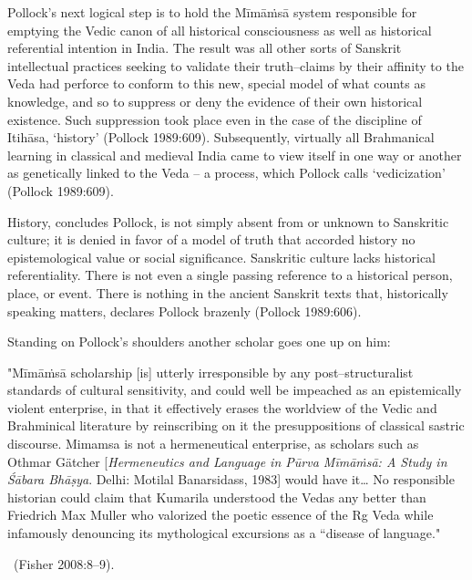 Pollock’s next logical step is to hold the Mīmāṁsā system responsible for emptying the Vedic canon of all historical consciousness as well as historical referential intention in India. The result was all other sorts of Sanskrit intellectual practices seeking to validate their truth–claims by their affinity to the Veda had perforce to conform to this new, special model of what counts as knowledge, and so to suppress or deny the evidence of their own historical existence. Such suppression took place even in the case of the discipline of Itihāsa, ‘history’ (Pollock 1989:609). Subsequently, virtually all Brahmanical learning in classical and medieval India came to view itself in one way or another as genetically linked to the Veda – a process, which Pollock calls ‘vedicization’ (Pollock 1989:609).

History, concludes Pollock, is not simply absent from or unknown to Sanskritic culture; it is denied in favor of a model of truth that accorded history no epistemological value or social significance. Sanskritic culture lacks historical referentiality. There is not even a single passing reference to a historical person, place, or event. There is nothing in the ancient Sanskrit texts that, historically speaking matters, declares Pollock brazenly (Pollock 1989:606).

Standing on Pollock’s shoulders another scholar goes one up on him:

\begin{myquote}
"Mīmāṁsā scholarship [is] utterly irresponsible by any post–structuralist standards of cultural sensitivity, and could well be impeached as an epistemically violent enterprise, in that it effectively erases the worldview of the Vedic and Brahminical literature by reinscribing on it the presuppositions of classical sastric discourse. Mimamsa is not a hermeneutical enterprise, as scholars such as Othmar Gätcher [\textit{Hermeneutics and Language in Pūrva Mīmāṁsā: A Study in Śābara Bhāṣya}. Delhi: Motilal Banarsidass, 1983] would have it… No responsible historian could claim that Kumarila understood the Vedas any better than Friedrich Max Muller who valorized the poetic essence of the Rg Veda while infamously denouncing its mythological excursions as a “disease of language."

~\hfill (Fisher 2008:8–9).
\end{myquote}


